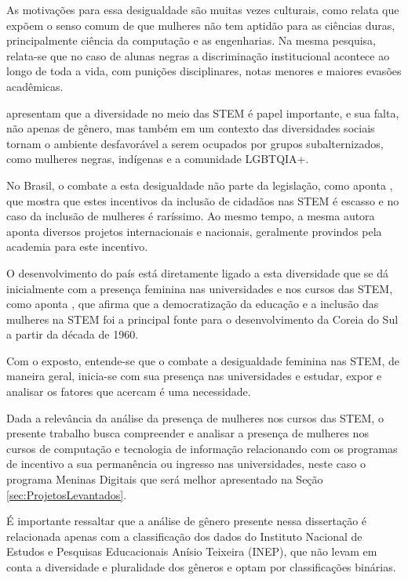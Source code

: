 As motivações para essa desigualdade são muitas vezes culturais, como relata  que expõem o senso comum de que mulheres não tem aptidão para as ciências duras, principalmente ciência da computação e as engenharias. Na mesma pesquisa, relata-se que no caso de alunas negras a discriminação institucional acontece ao longo de toda a vida, com punições disciplinares, notas menores e maiores evasões acadêmicas.

 apresentam que a diversidade no meio das STEM é papel importante, e sua falta, não apenas de gênero, mas também em um contexto das diversidades sociais tornam o ambiente desfavorável a serem ocupados por grupos subalternizados, como mulheres negras, indígenas e a comunidade LGBTQIA+.


No Brasil, o combate a esta desigualdade não parte da legislação, como aponta , que mostra que estes incentivos da inclusão de cidadãos nas STEM é escasso e no caso da inclusão de mulheres é raríssimo. Ao mesmo tempo, a mesma autora aponta diversos projetos internacionais e nacionais, geralmente provindos pela academia para este incentivo.

O desenvolvimento do país está diretamente ligado a esta diversidade que se dá inicialmente com a presença feminina nas universidades e nos cursos das STEM, como aponta , que afirma que a democratização da educação e a inclusão das mulheres na STEM foi a principal fonte para o desenvolvimento da Coreia do Sul a partir da década de 1960.

Com o exposto, entende-se que o combate a desigualdade feminina nas STEM, de maneira geral, inicia-se com sua presença nas universidades e estudar, expor e analisar os fatores que acercam é uma necessidade.

Dada a relevância da análise da presença de mulheres nos cursos das STEM, o presente trabalho busca compreender e analisar a presença de mulheres nos cursos de computação e tecnologia de informação relacionando com os programas de incentivo a sua permanência ou ingresso nas universidades, neste caso o programa Meninas Digitais que será melhor apresentado na Seção \ref{sec:ProjetosLevantados}.

É importante ressaltar que a análise de gênero presente nessa dissertação é relacionada apenas com a classificação dos dados do Instituto Nacional de Estudos e Pesquisas Educacionais Anísio Teixeira (INEP), que não levam em conta a diversidade e pluralidade dos gêneros e optam por classificações binárias.



